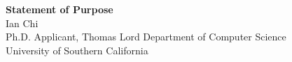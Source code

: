 \documentclass[11pt]{article}
\begin{document}
\begin{center}
    {\Large \textbf{Statement of Purpose}}\\[4pt]
    {\large Ian Chi}\\[2pt]
    Ph.D. Applicant, Thomas Lord Department of Computer Science\\
    University of Southern California
\end{center}

\vspace{1em}

\end{document}
